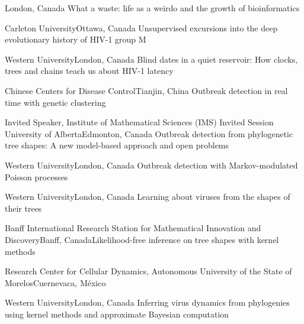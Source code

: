 {}{London, Canada}
{What a waste: life as a weirdo and the growth of bioinformatics}

{Carleton University}{Ottawa, Canada}
{Unsupervised excursions into the deep evolutionary history of HIV-1 group M}

{Western University}{London, Canada}
{Blind dates in a quiet reservoir: How clocks, trees and chains teach us about HIV-1 latency}

{Chinese Centers for Disease Control}{Tianjin, China}
{Outbreak detection in real time with genetic clustering}

{Invited Speaker, Institute of Mathematical Sciences (IMS) Invited Session}
{University of Alberta}{Edmonton, Canada}
{Outbreak detection from phylogenetic tree shapes: A new model-based approach and open problems}

{Western University}{London, Canada}
{Outbreak detection with Markov-modulated Poisson processes}

{Western University}{London, Canada}
{Learning about viruses from the shapes of their trees}

{Banff International Research Station for Mathematical Innovation and Discovery}{Banff, Canada}{Likelihood-free inference on tree shapes with kernel methods}

{Research Center for Cellular Dynamics, Autonomous University of the State of Morelos}{Cuernevaca, M\'exico}
{}

{Western University}{London, Canada}
{Inferring virus dynamics from phylogenies using kernel methods and approximate Bayesian computation}

